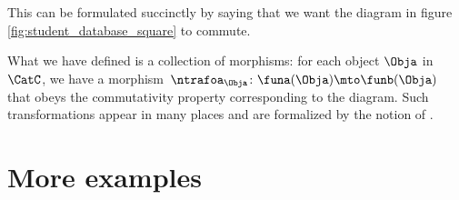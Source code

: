 %
\begin{marginfigure}
    \centering
    \caption{}
    \label{fig:student_database_square}
\end{marginfigure}
%

This can be formulated succinctly by saying that we want the diagram in figure \cref{fig:student_database_square} to commute.

What we have defined is a collection of morphisms: for each object $\Obja$ in~$\CatC$, we have a morphism~$\ntrafoa_\Obja \colon \funa(\Obja) \mto \funb(\Obja)$ that obeys the commutativity property corresponding to the diagram.
Such transformations appear in many places and are formalized by the notion of .
\section{More examples}



